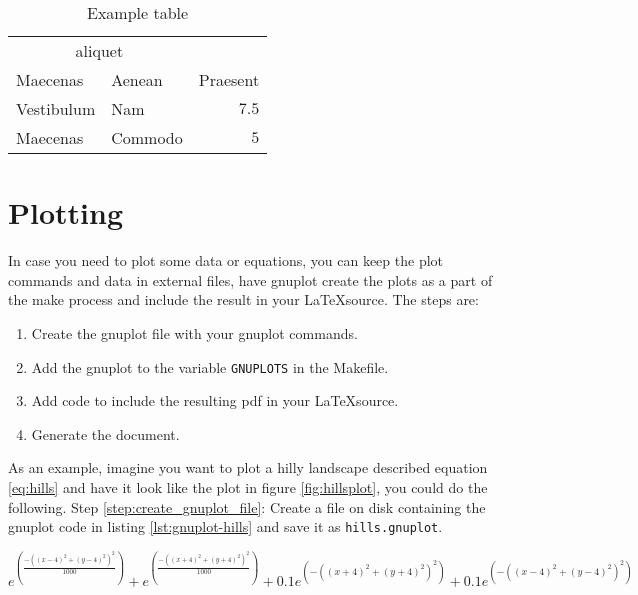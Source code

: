\documentclass[10pt, a4paper]{article} %
\newcommand{\code}[1]{\texttt{#1}}
\newcommand{\filename}[1]{\texttt{#1}}
\begin{document}
\begin{table}
	\caption{Example table}
	\centering
	\begin{tabular}{llr}
		\toprule
		\multicolumn{2}{c}{aliquet} \\
		\cmidrule(r){1-2}
		Maecenas & Aenean & Praesent \\
		\midrule
		Vestibulum & Nam & $7.5$ \\
		Maecenas & Commodo & $5$ \\
		\bottomrule
	\end{tabular}
\end{table}




\section{Plotting}

In case you need to plot some data or equations, you can keep the plot commands and data in external files, have gnuplot create the plots as a part of the make process and include the result in your \LaTeX source.  The steps are:
\begin{enumerate}
	\item Create the gnuplot file with your gnuplot commands. \label{step:create_gnuplot_file}
	\item Add the gnuplot to the variable \code{GNUPLOTS} in the Makefile. \label{step:add}
	\item Add code to include the resulting pdf in your \LaTeX source.	 \label{step:add-pdf-to-latex}
	\item Generate the document. \label{step:generate-document}
\end{enumerate}

As an example, imagine you want to plot a hilly landscape described equation \ref{eq:hills} and have it look like the plot in figure \ref{fig:hillsplot}, you could do the following. 
Step \ref{step:create_gnuplot_file}: Create a file on disk containing the gnuplot code in listing  \ref{lst:gnuplot-hills} and save it as \filename{hills.gnuplot}.

\begin{equation}
e^{\left(    \frac{ -\left (  \left( x - 4  \right)^2 + \left( y-4\right)^2 \right )^2 }{1000} \right)}
+
e^{\left(    \frac{ -\left (  \left( x + 4  \right)^2 + \left( y+4\right)^2 \right )^2 }{1000} \right)}
+
0.1  e^{\left(     -\left (  \left( x + 4  \right)^2 + \left( y+4\right)^2 \right )^2 \right)}
+
0.1  e^{\left(     -\left (  \left( x - 4  \right)^2 + \left( y- 4\right)^2 \right )^2 \right)}
\label{eq:hills}
\end{equation}
\end{document}
